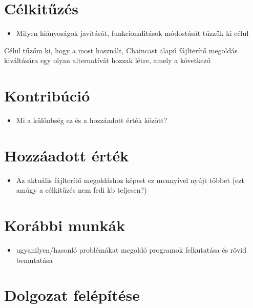 \section{Célkitűzés}
\begin{itemize}
  \item Milyen hiányoságok javítását, funkcionalitások módostását tűzzük ki célul
\end{itemize}
Célul tűzőm ki, hogy a most használt, Chaincast alapú fájlterítő megoldás kiváltására egy olyan alternatívát hozzak létre, amely a következő 


\section{Kontribúció}
\begin{itemize}
  \item Mi a különbség ez és a hozzáadott érték között?
\end{itemize}
\section{Hozzáadott érték}
\begin{itemize}
  \item Az aktuális fájlterítő megoldáshoz képest ez mennyivel nyújt többet (ezt amúgy a célkitűzés nem fedi kb teljesen?)
\end{itemize}
\section{Korábbi munkák}
\begin{itemize}
  \item ugyanilyen/hasonló problémákat megoldó programok felkutatása és rövid bemutatása
\end{itemize}
\section{Dolgozat felépítése}

